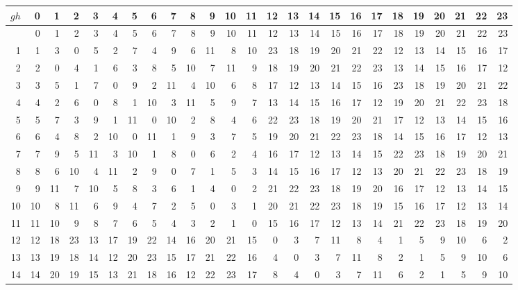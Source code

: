 \documentclass[10pt,a4paper]{article}
\numberwithin{equation}{section}
\begin{document}
{\normalsize\setlength{\tabcolsep}{0.1em}\setlength{\LTleft}{-8pt plus 1fill}\setlength{\LTright}{-8pt plus 1fill}\begin{longtable}{@{}r|rrrrrrrrrrrrrrrrrrrrrrrr@{}}\toprule
$gh$ & 0 & 1 & 2 & 3 & 4 & 5 & 6 & 7 & 8 & 9 & 10 & 11 & 12 & 13 & 14 & 15 & 16 & 17 & 18 & 19 & 20 & 21 & 22 & 23\\\midrule\endhead
\bottomrule\endfoot\endlastfoot
0 & 0 & 1 & 2 & 3 & 4 & 5 & 6 & 7 & 8 & 9 & 10 & 11 & 12 & 13 & 14 & 15 & 16 & 17 & 18 & 19 & 20 & 21 & 22 & 23\\*
1 & 1 & 3 & 0 & 5 & 2 & 7 & 4 & 9 & 6 & 11 & 8 & 10 & 23 & 18 & 19 & 20 & 21 & 22 & 12 & 13 & 14 & 15 & 16 & 17\\
2 & 2 & 0 & 4 & 1 & 6 & 3 & 8 & 5 & 10 & 7 & 11 & 9 & 18 & 19 & 20 & 21 & 22 & 23 & 13 & 14 & 15 & 16 & 17 & 12\\
3 & 3 & 5 & 1 & 7 & 0 & 9 & 2 & 11 & 4 & 10 & 6 & 8 & 17 & 12 & 13 & 14 & 15 & 16 & 23 & 18 & 19 & 20 & 21 & 22\\
4 & 4 & 2 & 6 & 0 & 8 & 1 & 10 & 3 & 11 & 5 & 9 & 7 & 13 & 14 & 15 & 16 & 17 & 12 & 19 & 20 & 21 & 22 & 23 & 18\\
5 & 5 & 7 & 3 & 9 & 1 & 11 & 0 & 10 & 2 & 8 & 4 & 6 & 22 & 23 & 18 & 19 & 20 & 21 & 17 & 12 & 13 & 14 & 15 & 16\\
6 & 6 & 4 & 8 & 2 & 10 & 0 & 11 & 1 & 9 & 3 & 7 & 5 & 19 & 20 & 21 & 22 & 23 & 18 & 14 & 15 & 16 & 17 & 12 & 13\\
7 & 7 & 9 & 5 & 11 & 3 & 10 & 1 & 8 & 0 & 6 & 2 & 4 & 16 & 17 & 12 & 13 & 14 & 15 & 22 & 23 & 18 & 19 & 20 & 21\\
8 & 8 & 6 & 10 & 4 & 11 & 2 & 9 & 0 & 7 & 1 & 5 & 3 & 14 & 15 & 16 & 17 & 12 & 13 & 20 & 21 & 22 & 23 & 18 & 19\\
9 & 9 & 11 & 7 & 10 & 5 & 8 & 3 & 6 & 1 & 4 & 0 & 2 & 21 & 22 & 23 & 18 & 19 & 20 & 16 & 17 & 12 & 13 & 14 & 15\\
10 & 10 & 8 & 11 & 6 & 9 & 4 & 7 & 2 & 5 & 0 & 3 & 1 & 20 & 21 & 22 & 23 & 18 & 19 & 15 & 16 & 17 & 12 & 13 & 14\\
11 & 11 & 10 & 9 & 8 & 7 & 6 & 5 & 4 & 3 & 2 & 1 & 0 & 15 & 16 & 17 & 12 & 13 & 14 & 21 & 22 & 23 & 18 & 19 & 20\\
12 & 12 & 18 & 23 & 13 & 17 & 19 & 22 & 14 & 16 & 20 & 21 & 15 & 0 & 3 & 7 & 11 & 8 & 4 & 1 & 5 & 9 & 10 & 6 & 2\\
13 & 13 & 19 & 18 & 14 & 12 & 20 & 23 & 15 & 17 & 21 & 22 & 16 & 4 & 0 & 3 & 7 & 11 & 8 & 2 & 1 & 5 & 9 & 10 & 6\\
14 & 14 & 20 & 19 & 15 & 13 & 21 & 18 & 16 & 12 & 22 & 23 & 17 & 8 & 4 & 0 & 3 & 7 & 11 & 6 & 2 & 1 & 5 & 9 & 10\\

\end{longtable}}
\end{document}

